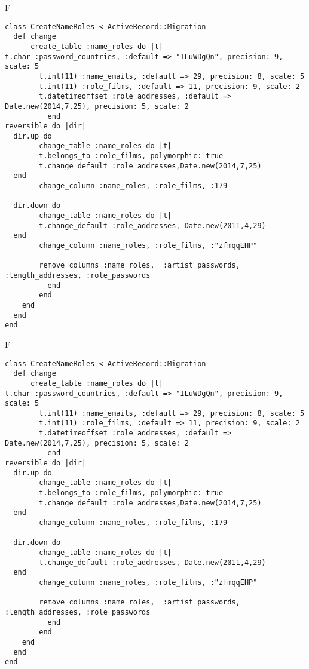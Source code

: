 F
\begin{verbatim}
class CreateNameRoles < ActiveRecord::Migration
  def change
	  create_table :name_roles do |t|
t.char :password_countries, :default => "ILuWDgQn", precision: 9, scale: 5
		t.int(11) :name_emails, :default => 29, precision: 8, scale: 5
		t.int(11) :role_films, :default => 11, precision: 9, scale: 2
		t.datetimeoffset :role_addresses, :default => Date.new(2014,7,25), precision: 5, scale: 2
		  end
reversible do |dir|
  dir.up do
		change_table :name_roles do |t|
		t.belongs_to :role_films, polymorphic: true
 		t.change_default :role_addresses,Date.new(2014,7,25)
  end
 		change_column :name_roles, :role_films, :179
   
  dir.down do
		change_table :name_roles do |t|
		t.change_default :role_addresses, Date.new(2011,4,29)
  end
 		change_column :name_roles, :role_films, :"zfmqqEHP"
   
		remove_columns :name_roles,  :artist_passwords, :length_addresses, :role_passwords 
	      end
	    end
    end 
  end
end

\end{verbatim}

F
\begin{verbatim}
class CreateNameRoles < ActiveRecord::Migration
  def change
	  create_table :name_roles do |t|
t.char :password_countries, :default => "ILuWDgQn", precision: 9, scale: 5
		t.int(11) :name_emails, :default => 29, precision: 8, scale: 5
		t.int(11) :role_films, :default => 11, precision: 9, scale: 2
		t.datetimeoffset :role_addresses, :default => Date.new(2014,7,25), precision: 5, scale: 2
		  end
reversible do |dir|
  dir.up do
		change_table :name_roles do |t|
		t.belongs_to :role_films, polymorphic: true
 		t.change_default :role_addresses,Date.new(2014,7,25)
  end
 		change_column :name_roles, :role_films, :179
   
  dir.down do
		change_table :name_roles do |t|
		t.change_default :role_addresses, Date.new(2011,4,29)
  end
 		change_column :name_roles, :role_films, :"zfmqqEHP"
   
		remove_columns :name_roles,  :artist_passwords, :length_addresses, :role_passwords 
	      end
	    end
    end 
  end
end

\end{verbatim}

